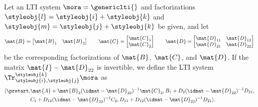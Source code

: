     \begin{definition}\label{def:trace-lti}
        Let an LTI system $\mora = \genericlti{}$ and factorizations $\styleobj{l} = \styleobj{i} + \styleobj{k}$ and $\styleobj{m} = \styleobj{j} + \styleobj{k}$ be given, and let
        \begin{equation}\label{eq:LTI-induced-block-forms}
            \mat{B} =
            \begin{bmatrix}
                \mat{B}_1 & \mat{B}_2
            \end{bmatrix}
            \qquad
            \mat{C} =
            \begin{bmatrix}
                \mat{C}_1 \\
                \mat{C}_2
            \end{bmatrix}
            \qquad
            \mat{D} =
            \begin{bmatrix}
                \mat{D}_{11} & \mat{D}_{12} \\
                \mat{D}_{21} & \mat{D}_{22}
            \end{bmatrix}
        \end{equation}
        be the corresponding factorizations of $\mat{B}$, $\mat{C}$, and $\mat{D}$. If the matrix $\mat{I} - \mat{D}_{22}$ is invertible, we define the LTI system $\Tr_{\styleobj{i},\styleobj{j}}^{\styleobj{k}}\mora$ as
        \begin{equation}
            \begin{aligned}
                \langle\prstart, & \mat{A} + \mat{B}_2 (\idmat- \mat{D}_{22})^{-1} \mat{C}_2 , B_1 + D_2(\idmat- \mat{D}_{22})^{-1}
                D_{21}, \\
                                 & C_1 + D_{12}(\idmat- \mat{D}_{22})^{-1}C_2, D_{11} + D_{12}(\idmat- \mat{D}_{22})^{-1}D_{21} \rangle.
            \end{aligned}
        \end{equation}
    \end{definition}

